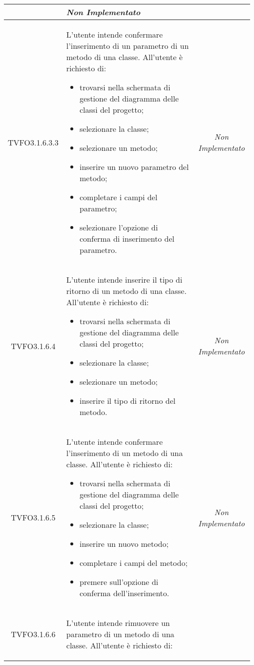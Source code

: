 \begin{longtable}{|c|>{}m{8cm}|c|}
\begin{itemize}
\end{itemize} & \textit{Non Implementato}\\ \hline
\hypertarget{TVFO3.1.6.3.3}{TVFO3.1.6.3.3} & L'utente intende confermare l'inserimento di un parametro di un metodo di una classe.
All'utente è richiesto di:
\begin{itemize}
\item trovarsi nella schermata di gestione del diagramma delle classi del progetto;
\item selezionare la classe;
\item selezionare un metodo;
\item inserire un nuovo parametro del metodo;
\item completare i campi del parametro;
\item selezionare l'opzione di conferma di inserimento del parametro.
\end{itemize} & \textit{Non Implementato}\\ \hline
\hypertarget{TVFO3.1.6.4}{TVFO3.1.6.4} & L'utente intende inserire il tipo di ritorno di un metodo di una classe.
All'utente è richiesto di:
\begin{itemize}
\item trovarsi nella schermata di gestione del diagramma delle classi del progetto;
\item selezionare la classe;
\item selezionare un metodo;
\item inserire il tipo di ritorno del metodo.
\end{itemize} & \textit{Non Implementato}\\ \hline
\hypertarget{TVFO3.1.6.5}{TVFO3.1.6.5} & L'utente intende confermare l'inserimento di un metodo di una classe. 
All'utente è richiesto di: 
\begin{itemize} 
\item trovarsi nella schermata di gestione del diagramma delle classi del progetto; 
\item selezionare la classe; 
\item inserire un nuovo metodo; 
\item completare i campi del metodo;
\item premere sull'opzione di conferma dell'inserimento.  
\end{itemize} & \textit{Non Implementato}\\ \hline
\hypertarget{TVFO3.1.6.6}{TVFO3.1.6.6} & L'utente intende rimuovere un parametro di un metodo di una classe.
All'utente è richiesto di:
\begin{itemize}

\end{itemize}
\end{longtable}
